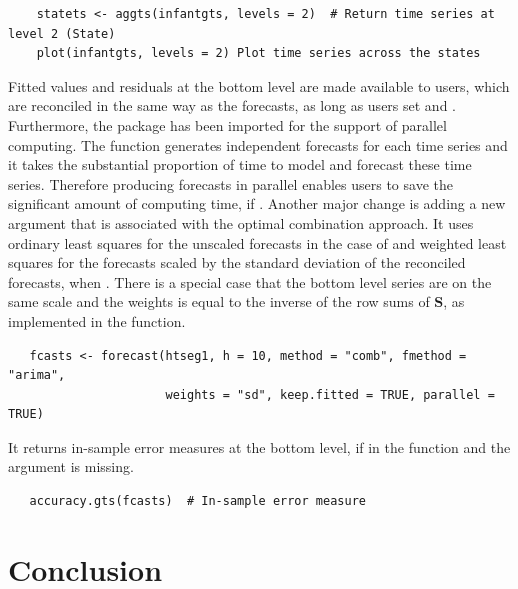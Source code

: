 \documentclass[nojss]{jss}
\begin{document}
\begin{description}
   \begin{verbatim}
    statets <- aggts(infantgts, levels = 2)  # Return time series at level 2 (State)
    plot(infantgts, levels = 2) Plot time series across the states
   \end{verbatim}
 \item[\code{forecast}] Fitted values and residuals at the bottom level are made available to users, which are reconciled in the same way as the forecasts, as long as users set  and . Furthermore, the  package has been imported for the support of parallel computing. The  function generates independent forecasts for each time series and it takes the substantial proportion of time to model and forecast these time series. Therefore producing forecasts in parallel enables users to save the significant amount of computing time, if . Another major change is adding a new argument  that is associated with the optimal combination approach. It uses ordinary least squares for the unscaled forecasts in the case of  and weighted least squares for the forecasts scaled by the standard deviation of the reconciled forecasts, when . There is a special case that the bottom level series are on the same scale and the weights is equal to the inverse of the row sums of $\bm{S}$, as  implemented in the  function. \\
   \begin{verbatim}
   fcasts <- forecast(htseg1, h = 10, method = "comb", fmethod = "arima", 
                      weights = "sd", keep.fitted = TRUE, parallel = TRUE)
   \end{verbatim}
 \item[\code{accuracy.gts}] It returns in-sample error measures at the bottom level, if  in the  function and the argument  is missing.
   \begin{verbatim}
   accuracy.gts(fcasts)  # In-sample error measure
   \end{verbatim}
\end{description}
   
\section*{Conclusion}
\end{document}

